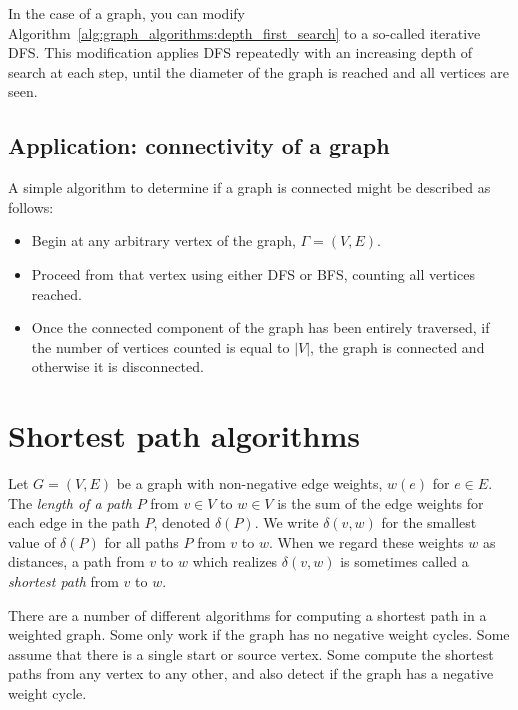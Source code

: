 In the case of a graph, you can modify
Algorithm~\ref{alg:graph_algorithms:depth_first_search} to a so-called
iterative DFS. This modification applies DFS repeatedly with an
increasing depth of search at each step, until the diameter of the
graph is reached and all vertices are seen.

\subsection{Application: connectivity of a graph}


A simple algorithm to determine if a graph is connected
might be described as follows:
\begin{itemize}

\item
Begin at any arbitrary vertex of the graph, $\Gamma=(V,E)$.

\item
Proceed from that vertex using either DFS or BFS, counting all
vertices reached.

\item
Once the connected component of the graph has been entirely traversed,
if the number of vertices counted is equal to $|V|$,
the graph is connected and otherwise it is disconnected.
\end{itemize}



\section{Shortest path algorithms}


Let $G = (V,E)$ be a graph with non-negative edge weights, $w(e)$ for
$e \in E$. The \emph{length of a path} $P$ from $v \in V$ to $w \in V$ is the sum of
the edge weights for each edge in the path $P$, denoted
$\delta(P)$. We write $\delta(v,w)$ for the smallest value of
$\delta(P)$ for all paths $P$ from $v$ to $w$.
When we regard these weights $w$ as distances,
a path from $v$ to $w$ which realizes $\delta(v,w)$ is
sometimes called a {\it shortest path} from $v$ to $w$.

There are a number of different algorithms for computing a shortest
path in a weighted graph. Some only work if the graph has
no negative weight cycles. Some assume that there is a single
start or source vertex. Some compute the shortest paths from
any vertex to any other, and also detect if the graph has
a negative weight cycle.

